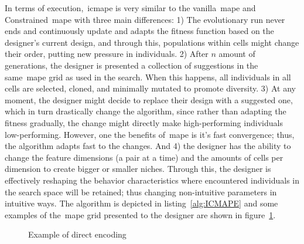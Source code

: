 In terms of execution,~\acrshort{icmape} is very similar to the vanilla~\acrshort{mape} and Constrained~\acrshort{mape} with three main differences: 1) The evolutionary run never ends and continuously update and adapts the fitness function based on the designer's current design, and through this, populations within cells might change their order, putting new pressure in individuals. 2) After $n$ amount of generations, the designer is presented a collection of suggestions in the same~\acrshort{mape} grid as used in the search. When this happens, all individuals in all cells are selected, cloned, and minimally mutated to promote diversity. 3) At any moment, the designer might decide to replace their design with a suggested one, which in turn drastically change the algorithm, since rather than adapting the fitness gradually, the change might directly make high-performing individuals low-performing. However, one the benefits of~\acrshort{mape} is it's fast convergence; thus, the algorithm adapts fast to the changes. And 4) the designer has the ability to change the feature dimensions (a pair at a time) and the amounts of cells per dimension to create bigger or smaller niches. Through this, the designer is effectively reshaping the behavior characteristics where encountered individuals in the search space will be retained; thus changing non-intuitive parameters in intuitive ways. The algorithm is depicted in listing~\ref{alg:ICMAPE} and some examples of the~\acrshort{mape} grid presented to the designer are shown in figure~\ref{fig:MAPEGrid1}.

\begin{figure}[!h]
    \centering
     \hfill
    
    \caption{Example of direct encoding}
    \label{fig:MAPEGrid1}
\end{figure}

